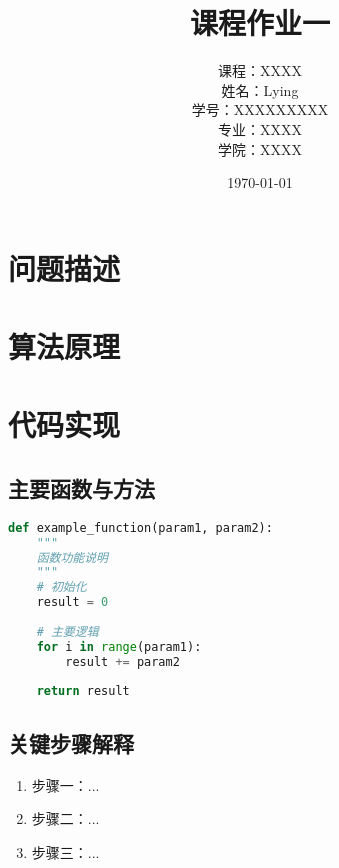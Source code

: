 \documentclass[letterpaper,12pt]{article}
\title{
    \textbf{课程作业一}
}
\author{
    \Large{课程：XXXX} \\[0.5cm]
    \Large{姓名：Lying} \\[0.3cm]
    \Large{学号：XXXXXXXXX} \\[0.3cm]
    \Large{专业：XXXX} \\[0.3cm]
    \Large{学院：XXXX}
}
\date{\vspace{2cm}\today}
\begin{document}
\begin{titlepage}
\maketitle
\thispagestyle{empty}
\end{titlepage}

\newpage
\setcounter{page}{1}

\begin{abstract}
\end{abstract}

\section{问题描述}

\section{算法原理}

\section{代码实现}

\subsection{主要函数与方法}
\begin{lstlisting}[language=Python, caption=示例代码]
def example_function(param1, param2):
    """
    函数功能说明
    """
    # 初始化
    result = 0
    
    # 主要逻辑
    for i in range(param1):
        result += param2
        
    return result
\end{lstlisting}

\subsection{关键步骤解释}
\begin{enumerate}[label=\arabic*., leftmargin=*]
    \item 步骤一：...
    \item 步骤二：...
    \item 步骤三：...
\end{enumerate}
\end{document}
